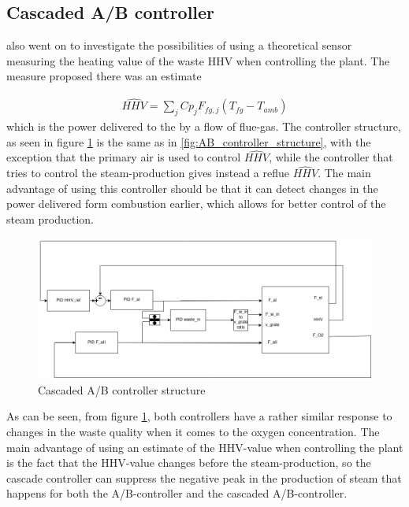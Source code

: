 \subsection{Cascaded A/B controller}
\cite{summer_student} also went on to investigate the possibilities of using a theoretical sensor measuring the heating value of the waste HHV when controlling the plant. The measure proposed there was an estimate

\begin{align}
    \hat{HHV} = \sum_j Cp_j F_{fg,j} \left( T_{fg} - T_{amb} \right)
\end{align}
which is the power delivered to the by a flow of flue-gas. The controller structure, as seen in figure \ref{fig:cascade_controller_structure} is the same as in \ref{fig:AB_controller_structure}, with the exception that the primary air is used to control $\hat{HHV}$, while the controller that tries to control the steam-production gives instead a reflue $\hat{HHV}$. The main advantage of using this controller should be that it can detect changes in the power delivered form combustion earlier, which allows for better control of the steam production. 

\begin{figure}[!ht]
    \centering
    \includegraphics[width=\textwidth]{img/Fig_dump/cascaded_controller.png}
    \caption{Cascaded A/B controller structure}
    \label{fig:cascade_controller_structure}
\end{figure}


As can be seen, from figure \ref{fig:cascade_controller_structure}, both controllers have a rather similar response to changes in the waste quality when it comes to the oxygen concentration. The main advantage of using an estimate of the HHV-value when controlling the plant is the fact that the HHV-value changes before the steam-production, so the cascade controller can suppress the negative peak in the production of steam that happens for both the A/B-controller and the cascaded A/B-controller.

